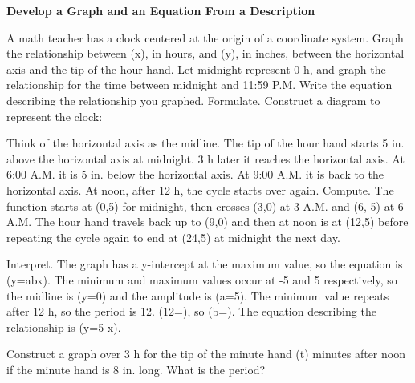 \documentclass{article}
\newenvironment{example}[1]{}{}         %
\newenvironment{tryit}[1]{}{}           %
\newcommand{\answer}[1]{}               %
\newcommand{\placeholder}[2]{}          %
\newcommand{\te}[1]{}                   %
\begin{document}
\begin{example}{5}
\textbf{Develop a Graph and an Equation From a Description}
\te{APPLICATION.}
A math teacher has a clock centered at the origin of a coordinate system. Graph the relationship between (x), in hours, and (y), in inches, between the horizontal axis and the tip of the hour hand. Let midnight represent 0 h, and graph the relationship for the time between midnight and 11:59 P.M. Write the equation describing the relationship you graphed.
Formulate. Construct a diagram to represent the clock:
\placeholder{diagram}{Analog clock face with numbers1 through12, gold rim, centered at origin of black arrowed coordinate axes x right and y up. Red hour-hand arrow points left toward9 and is labeled5 in.; gray long hand points toward2. Vertical axis passes12 and6, horizontal through9 and3.}
Think of the horizontal axis as the midline.
The tip of the hour hand starts 5 in. above the horizontal axis at midnight.
3 h later it reaches the horizontal axis.
At 6:00 A.M. it is 5 in. below the horizontal axis. At 9:00 A.M. it is back to the horizontal axis.
At noon, after 12 h, the cycle starts over again.
Compute. The function starts at (0,5) for midnight, then crosses (3,0) at 3 A.M. and (6,-5) at 6 A.M. The hour hand travels back up to (9,0) and then at noon is at (12,5) before repeating the cycle again to end at (24,5) at midnight the next day.
\placeholder{graph}{Red hour-hand height versus time, horizontal x Time(h), vertical y Height(in.), origin O; x labels4,8,12,16,20, grid2; y labels-6,-4,-2,2,4,6 grid1. Window0 to24,-7 to7. Red cosine starts(0,5), minima(6,-5),(18,-5), maxima(12,5),(24,5), zeros3,9,15,21; no marked points. Axes arrowed.}
Interpret. The graph has a y-intercept at the maximum value, so the equation is (y=a\cos bx).
The minimum and maximum values occur at -5 and 5 respectively, so the midline is (y=0) and the amplitude is (a=5).
The minimum value repeats after 12 h, so the period is 12.
(12=), so (b=\frac{}).
The equation describing the relationship is (y=5\cos\frac{} x).
\answer{(y=5\cos\frac\pi6 x); midline (y=0), amplitude5, period12 h.}
\end{example}
\begin{tryit}{5}
Construct a graph over 3 h for the tip of the minute hand (t) minutes after noon if the minute hand is 8 in. long. What is the period?
\answer{The period is 60.}
\placeholder{graph}{Try5 answer graph red cosine height, horizontal t Time(min), vertical y Height(in.); x labels30,60,90,120,150, grid15; y labels-8,-4,0,4,8, grid2, window0 to180,-12 to12. Maxima(0,8),(60,8),(120,8),(180,8); minima(30,-8),(90,-8),(150,-8); zeros15,45,75,105,135,165. Arrowed axes and curve end arrows.}
\end{tryit}
\end{document}
